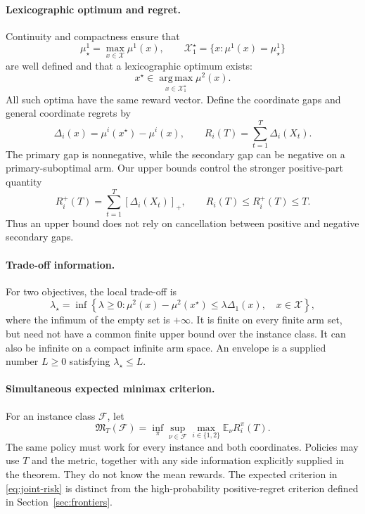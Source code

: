 \documentclass[11pt]{article}
\theoremstyle{definition}
\newcommand{\X}{\mathcal X}
\newcommand{\F}{\mathcal F}
\newcommand{\E}{\mathbb E}
\newcommand{\argmax}{\operatorname*{arg\,max}}
\begin{document}
\paragraph{Lexicographic optimum and regret.}
Continuity and compactness ensure that
\[
 \mu^1_\star=\max_{x\in\X}\mu^1(x),\qquad
 \X_1^\star=\{x:\mu^1(x)=\mu^1_\star\}
\]
are well defined and that a lexicographic optimum exists:
\[
 x^\star\in\argmax_{x\in\X_1^\star}\mu^2(x).
\]
All such optima have the same reward vector. Define the coordinate gaps
and general coordinate regrets by
\[
 \Delta_i(x)=\mu^i(x^\star)-\mu^i(x),\qquad
 R_i(T)=\sum_{t=1}^T\Delta_i(X_t).
\]
The primary gap is nonnegative, while the secondary gap can be negative
on a primary-suboptimal arm. Our upper bounds control the stronger
positive-part quantity
\[
 R_i^+(T)=\sum_{t=1}^T[\Delta_i(X_t)]_+,
 \qquad R_i(T)\le R_i^+(T)\le T.
\]
Thus an upper bound does not rely on cancellation between positive and
negative secondary gaps.

\paragraph{Trade-off information.}
For two objectives, the local trade-off is
\begin{equation}
\label{eq:lambda-def}
 \lambda_\star=
 \inf\left\{\lambda\ge0:
 \mu^2(x)-\mu^2(x^\star)\le\lambda\Delta_1(x),\quad x\in\X
 \right\},
\end{equation}
where the infimum of the empty set is $+\infty$.
It is finite on every finite arm set, but need not have a common
finite upper bound over the instance class. It can also be infinite
on a compact infinite arm space. An envelope is a supplied number
$L\ge0$ satisfying $\lambda_\star\le L$.

\paragraph{Simultaneous expected minimax criterion.}
For an instance class $\F$, let
\begin{equation}
\label{eq:joint-risk}
 \mathfrak M_T(\F)=
 \inf_\pi\sup_{\nu\in\F}
 \max_{i\in\{1,2\}}\E_\nu R_i^\pi(T).
\end{equation}
The same policy must work for every instance and both coordinates.
Policies may use $T$ and the metric, together with any side information
explicitly supplied in the theorem. They do not know the mean rewards.
The expected criterion in \eqref{eq:joint-risk} is distinct from the
high-probability positive-regret criterion defined in
Section~\ref{sec:frontiers}.
\end{document}
